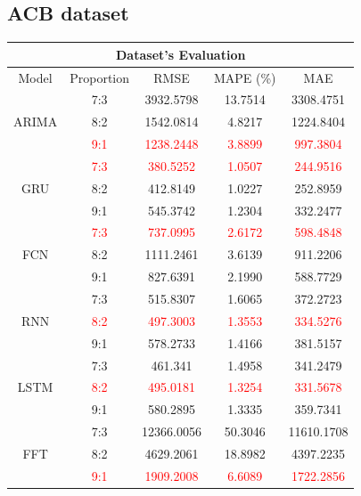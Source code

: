 \documentclass{ieeeojies}
\begin{document}
\subsection{ACB dataset}
\begin{table}[H]
    \centering
    \begin{tabular}{|c|c|c|c|c|}
         \hline
         \multicolumn{5}{|c|}{\textbf{Dataset's Evaluation}}\\
         \hline
         \centering Model & Proportion & RMSE & MAPE (\%) & MAE\\
\hline
\multirow{3}{*}{\centering ARIMA} & 7:3 & 3932.5798 & 13.7514 & 3308.4751 \\
     & 8:2 & 1542.0814 & 4.8217 & 1224.8404 \\
     & \textcolor{red}{9:1} & \textcolor{red}{1238.2448} & \textcolor{red}{3.8899} & \textcolor{red}{997.3804} \\
\hline
\multirow{3}{*}{\centering GRU}   & \textcolor{red}{7:3} & \textcolor{red}{380.5252} & \textcolor{red}{1.0507} & \textcolor{red}{244.9516} \\
     & 8:2 & 412.8149 & 1.0227 & 252.8959 \\
     & 9:1 & 545.3742 & 1.2304 & 332.2477 \\
\hline
\multirow{3}{*}{\centering FCN}   & \textcolor{red}{7:3} & \textcolor{red}{737.0995} & \textcolor{red}{2.6172} & \textcolor{red}{598.4848} \\
     & 8:2 & 1111.2461 & 3.6139 & 911.2206 \\
     & 9:1 & 827.6391 & 2.1990 & 588.7729 \\
\hline
\multirow{3}{*}{\centering RNN}   & 7:3 & 515.8307 & 1.6065 & 372.2723 \\
     & \textcolor{red}{8:2} & \textcolor{red}{497.3003} & \textcolor{red}{1.3553} & \textcolor{red}{334.5276} \\
     & 9:1 & 578.2733 & 1.4166 & 381.5157 \\
\hline
\multirow{3}{*}{\centering LSTM}  & 7:3 & 461.341 & 1.4958 & 341.2479 \\
     & \textcolor{red}{8:2} & \textcolor{red}{495.0181} & \textcolor{red}{1.3254} & \textcolor{red}{331.5678} \\
     & 9:1 & 580.2895 & 1.3335 & 359.7341 \\
\hline
\multirow{3}{*}{\centering FFT}   & 7:3 & 12366.0056 & 50.3046 & 11610.1708 \\
     & 8:2 & 4629.2061 & 18.8982 & 4397.2235 \\
     & \textcolor{red}{9:1} & \textcolor{red}{1909.2008} & \textcolor{red}{6.6089} & \textcolor{red}{1722.2856} \\

\end{tabular}
\end{table}
\end{document}
